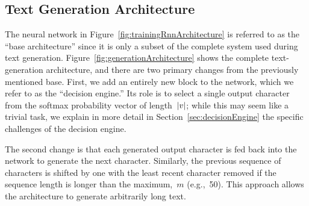 \documentclass{article}
\DeclarePairedDelimiter\abs{\lvert}{\rvert}%
\begin{document}
\subsection{Text Generation Architecture}\label{sec:generationRnnArchitecture}

The neural network in Figure~\ref{fig:trainingRnnArchitecture} is referred to as the ``base architecture'' since it is only a subset of the complete system used during text generation.  Figure~\ref{fig:generationArchitecture} shows the complete text-generation architecture, and there are two primary changes from the previously mentioned base.  First, we add an entirely new block to the network, which we refer to as the ``decision engine.''  Its role is to select a single output character from the softmax probability vector of length~$\abs*{v}$; while this may seem like a trivial task, we explain in more detail in Section~\ref{sec:decisionEngine} the specific challenges of the decision engine. 

The second change is that each generated output character is fed back into the network to generate the next character.  Similarly, the previous sequence of characters is shifted by one with the least recent character removed if the sequence length is longer than the maximum,~$m$ (e.g.,~50).  This approach allows the architecture to generate arbitrarily long text.
\end{document}
